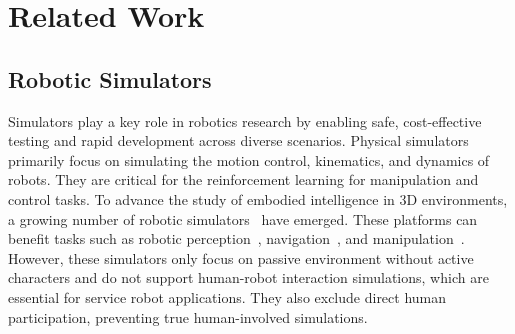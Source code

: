 \section{Related Work}
\label{sec:related}

\subsection{Robotic Simulators}
Simulators play a key role in robotics research by enabling safe, cost-effective testing and rapid development across diverse scenarios. Physical simulators~\cite{coumans2021,todorov2012mujoco,makoviychuk2021isaac} primarily focus on simulating the motion control, kinematics, and dynamics of robots. They are critical for the reinforcement learning for manipulation and control tasks.
To advance the study of embodied intelligence in 3D environments, a growing number of robotic simulators~\cite{kolve2017ai2, deitke2020robothor, ehsani2021manipulathor,shen2021igibson, li2021igibson, li2023behavior,savva2019habitat, szot2021habitat, puig2023habitat,nasiriany2024robocasa,wang2024grutopia} have emerged. 
These platforms 
can benefit tasks such as robotic perception~\cite{wang2024embodiedscan}, navigation~\cite{vuong2024habicrowd}, and manipulation~\cite{miller2004graspit}. 
However, these simulators only focus on passive environment without active characters and do not support human-robot interaction simulations, which are essential for service robot applications. They also exclude direct human participation, preventing true human-involved simulations.


